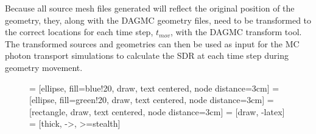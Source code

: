 Because all
source mesh files generated will reflect the original position of the geometry,
they, along with the DAGMC geometry files, need to be transformed to the 
correct locations for each time step, $t_{mov}$, with the DAGMC transform tool.  The
transformed sources and geometries can then be used as input for the MC photon
transport simulations to calculate the SDR at each time step during geometry movement.

\begin{figure}
\centering

         = [ellipse, fill=blue!20, draw, text centered, node distance=3cm]
         = [ellipse, fill=green!20, draw, text centered, node distance=3cm]
         = [rectangle, draw, text centered, node distance=3cm]
         = [draw, -latex]
         = [thick, ->, >=stealth]
        

\end{figure}
